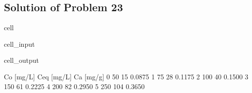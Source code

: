 \documentclass[letterpaper,10pt,english]{jupyterBook}
\begin{document}
\subsection{Solution of Problem 23}
\label{\detokenize{content/tutorials/T9/tutorial_09:solution-of-problem-23}}
\begin{sphinxuseclass}{cell}\begin{sphinxVerbatimInput}

\begin{sphinxuseclass}{cell_input}
\begin{sphinxVerbatim}[commandchars=\\\{\}]
   
   

   

    
  
\end{sphinxVerbatim}

\end{sphinxuseclass}\end{sphinxVerbatimInput}
\begin{sphinxVerbatimOutput}

\begin{sphinxuseclass}{cell_output}
\begin{sphinxVerbatim}[commandchars=\\\{\}]
   Co [mg/L]  Ceq [mg/L]  Ca [mg/g]
0         50          15     0.0875
1         75          28     0.1175
2        100          40     0.1500
3        150          61     0.2225
4        200          82     0.2950
5        250         104     0.3650
\end{sphinxVerbatim}

\end{sphinxuseclass}\end{sphinxVerbatimOutput}

\end{sphinxuseclass}
\end{document}
